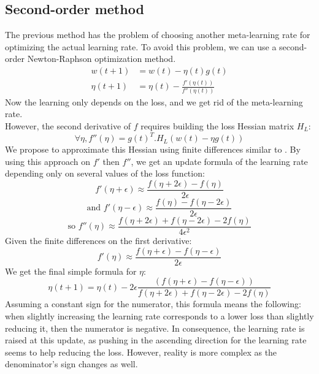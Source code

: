 \documentclass{article}
\begin{document}
  \subsection{Second-order method}
  
  The previous method has the problem of choosing another meta-learning rate for optimizing the actual learning rate. To avoid this problem, we can use a second-order Newton-Raphson optimization method. \\
  \begin{align}  
  w(t+1) &= w(t) -\eta(t)g(t)\\
  \eta(t+1) &= \eta(t) - \frac{f'(\eta(t))}{f''(\eta(t))}
  \end{align}
  Now the learning only depends on the loss, and we get rid of the meta-learning rate. \\
  However, the second derivative of $f$ requires building the loss Hessian matrix $H_{L}$:\\
  \begin{equation}
  \forall \eta, f''(\eta) = g(t)^{T}.H_{L}(w(t)-\eta g(t))
  \end{equation}
  We propose to approximate this Hessian using finite differences similar to \cite{martens2010deep}. By using this approach on $f'$ then $f''$, we get an update formula of the learning rate depending only on several values of the loss function:\\
  \begin{equation}
  f'(\eta+\epsilon) \approx \frac{f(\eta + 2\epsilon)-f(\eta)}{2\epsilon}
  \end{equation}
  \begin{equation}
  \text{and }f'(\eta-\epsilon) \approx \frac{f(\eta)-f(\eta-2\epsilon)}{2\epsilon}
  \end{equation}  
  \begin{equation}
  \text{so }f''(\eta) \approx \frac{f(\eta+2\epsilon)+f(\eta-2\epsilon)-2f(\eta)}{4 \epsilon^{2}}
  \end{equation}
  Given the finite differences on the first derivative:\\    
  \begin{equation}
  f'(\eta) \approx \frac{f(\eta+\epsilon)-f(\eta-\epsilon)}{2 \epsilon}
  \end{equation}
  We get the final simple formula for $\eta$:\\
  \begin{equation}
  \eta(t+1) = \eta(t) - 2\epsilon\frac{(f(\eta+\epsilon)-f(\eta-\epsilon))}{f(\eta+2\epsilon)+f(\eta-2\epsilon)-2f(\eta)}
  \end{equation}    
  Assuming a constant sign for the numerator, this formula means the following: when slightly increasing the learning rate corresponds to a lower loss than slightly reducing it, then the numerator is negative. In consequence, the learning rate is raised at this update, as pushing in the ascending direction for the learning rate seems to help reducing the loss. However, reality is more complex as the denominator's sign changes as well. 
\end{document}
